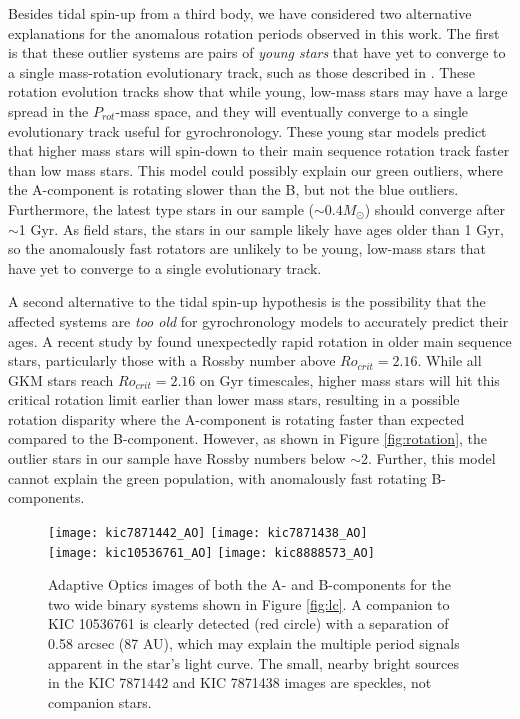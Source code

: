 \documentclass[preprint2]{aastex61}
\begin{document}
Besides tidal spin-up from a third body, we have considered two alternative explanations for the anomalous rotation periods observed in this work. The first is that these outlier systems are pairs of {\it young stars} that have yet to converge to a single mass-rotation evolutionary track, such as those described in \citet{agueros2011}. These rotation evolution tracks show that while young, low-mass stars may have a large spread in the $P_{rot}$-mass space, and they will eventually converge to a single evolutionary track useful for gyrochronology. These young star models predict that higher mass stars will spin-down to their main sequence rotation track faster than low mass stars. This model could possibly explain our green outliers, where the A-component is rotating slower than the B, but not the blue outliers.
Furthermore, the latest type stars in our sample ($\sim0.4 M_{\odot}$) should converge after $\sim$1 Gyr. As field stars, the stars in our sample likely have ages older than 1 Gyr, so the anomalously fast rotators are unlikely to be young, low-mass stars that have yet to converge to a single evolutionary track. 


A second alternative to the tidal spin-up hypothesis is the possibility that the affected systems are {\it too old} for gyrochronology models to accurately predict their ages. A recent study by \citet{vansaders2016} found unexpectedly rapid rotation in older main sequence stars, particularly those with a Rossby number above $Ro_{crit} = 2.16$. While all GKM stars reach $Ro_{crit} = 2.16$ on Gyr timescales, higher mass stars will hit this critical rotation limit earlier than lower mass stars, resulting in a possible rotation disparity where the A-component is rotating faster than expected compared to the B-component. However, as shown in Figure \ref{fig:rotation}, the outlier stars in our sample have Rossby numbers below $\sim$2. Further, this model cannot explain the green population, with anomalously fast rotating B-components.


\begin{figure}[ht]
\centering
\texttt{[image: kic7871442\_AO]}
\texttt{[image: kic7871438\_AO]}\\
\texttt{[image: kic10536761\_AO]}
\texttt{[image: kic8888573\_AO]}
\caption{Adaptive Optics images of both the A- and B-components for the two wide binary systems shown in Figure \ref{fig:lc}. A companion to KIC 10536761 is clearly detected (red circle) with a separation of 0.58 arcsec (87 AU), which may explain the multiple period signals apparent in the star's light curve. The small, nearby bright sources in the KIC 7871442 and KIC 7871438 images are speckles, not companion stars.
}
\label{fig:ao}
\end{figure}
\end{document}

